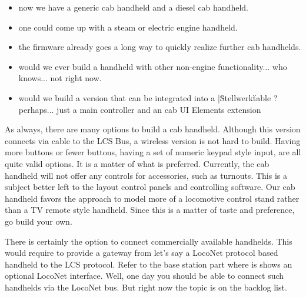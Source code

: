 \begin{itemize}
\item now we have a generic cab handheld and a diesel cab handheld.
\item one could come up with a steam or electric engine handheld. 
\item the firmware already goes a long way to quickly realize further cab handhelds.
\item would we ever build a handheld with other non-engine functionality... who knows... not right now.
\item would we build a version that can be integrated into a |\"Stellwerk\" table ? perhaps... just a main controller and an cab UI Elements extension
\end{itemize}

As always, there are many options to build a cab handheld. Although this version connects via cable to the LCS Bus, a wireless version is not hard to build. Having more buttons or fewer buttons, having a set of numeric keypad style input, are all quite valid options. It is a matter of what is preferred. Currently, the cab handheld will not offer any controls for accessories, such as turnouts. This is a subject better left to the layout control panels and controlling software. Our cab handheld favors the approach to model more of a locomotive control stand rather than a TV remote style handheld. Since this is a matter of taste and preference, go build your own.

There is certainly the option to connect commercially available handhelds. This would require to provide a gateway from let's say a LocoNet protocol based handheld to the LCS protocol. Refer to the base station part where is shows an optional LocoNet interface. Well, one day you should be able to connect such handhelds via the LocoNet bus. But right now the topic is on the backlog list.